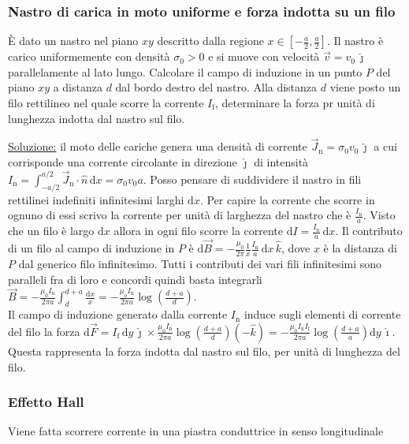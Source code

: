 \documentclass[11pt,a4paper]{article}
\begin{document}
\subsubsection{Nastro di carica in moto uniforme e forza indotta su un filo}
È dato un nastro nel piano $xy$ descritto dalla regione $x\in[-\frac a2,\frac a2]$. Il nastro è carico uniformemente con densità $\sigma_0>0$ e si muove con velocità $\vec v=v_0\,\hat\jmath$ parallelamente al lato lungo. Calcolare il campo di induzione in un punto $P$ del piano $xy$ a distanza $d$ dal bordo destro del nastro. Alla distanza $d$ viene posto un filo rettilineo nel quale scorre la corrente $I_\mathrm f$, determinare la forza pr unità di lunghezza indotta dal nastro sul filo.

\underline{Soluzione:} il moto delle cariche genera una densità di corrente $\vec J_\mathrm n=\sigma_0v_0\,\hat\jmath$ a cui corrisponde una corrente circolante in direzione $\hat\jmath$ di intensità $I_\mathrm n=\int_{-a/2}^{a/2}\vec J_\mathrm n\cdot\hat n\,\mathrm dx=\sigma_0v_0a$. Posso pensare di suddividere il nastro in fili rettilinei indefiniti infinitesimi larghi $\mathrm dx$. Per capire la corrente che scorre in ognuno di essi scrivo la corrente per unità di larghezza del nastro che è $\frac{I_\mathrm n}a$. Visto che un filo è largo $\mathrm dx$ allora in ogni filo scorre la corrente $\mathrm dI=\frac {I_\mathrm n}a\,\mathrm dx$. Il contributo di un filo al campo di induzione in $P$ è $\mathrm d\vec B=-\frac{\mu_0}{2\pi}\frac 1x\frac{I_\mathrm n}a\,\mathrm dx\,\hat k$, dove $x$ è la distanza di $P$ dal generico filo infinitesimo. Tutti i contributi dei vari fili infinitesimi sono paralleli fra di loro e concordi quindi basta integrarli $\vec B=-\frac{\mu_0I_\mathrm n}{2\pi a}\int_d^{d+a}\frac{\mathrm dx}{x}=-\frac{\mu_oI_\mathrm n}{2\pi a}\log(\frac{d+a}{d})$.\\
Il campo di induzione generato dalla corrente $I_\mathrm n$ induce sugli elementi di corrente del filo la forza $\mathrm d\vec F=I_\mathrm f\,\mathrm dy\,\hat\jmath\times\frac{\mu_0I_\mathrm n}{2\pi a}\log(\frac{d+a}{d})(-\hat k)=-\frac{\mu_0I_\mathrm nI_\mathrm f}{2\pi a}\log(\frac{d+a}a)\mathrm dy\,\hat\imath$. Questa rappresenta la forza indotta dal nastro sul filo, per unità di lunghezza del filo.

\subsubsection{Effetto Hall}
Viene fatta scorrere corrente in una piastra conduttrice in senso longitudinale
\end{document}

